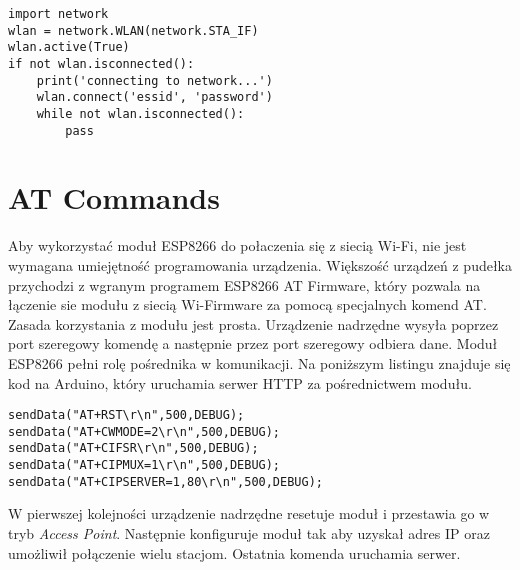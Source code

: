 \begin{lstlisting}[style=custompython, caption={Przykładowy kod do 
    połączenia się z siecią Wi-Fi w języku MicroPython},
    captionpos=b]
import network
wlan = network.WLAN(network.STA_IF)
wlan.active(True)
if not wlan.isconnected():
    print('connecting to network...')
    wlan.connect('essid', 'password')
    while not wlan.isconnected():
        pass
\end{lstlisting}


 
\section{AT Commands}
\label{AT}
Aby wykorzystać moduł ESP8266 do połaczenia się z siecią Wi-Fi, nie jest wymagana
umiejętność programowania urządzenia. Większość urządzeń z pudełka przychodzi z wgranym
programem ESP8266 AT Firmware, który pozwala na łączenie sie modułu z siecią Wi-Firmware
za pomocą specjalnych komend AT. Zasada korzystania z modułu jest prosta. Urządzenie 
nadrzędne wysyła poprzez port szeregowy komendę a następnie przez port szeregowy odbiera dane.
Moduł ESP8266 pełni rolę pośrednika w komunikacji. Na poniższym listingu znajduje się 
kod na Arduino, który uruchamia serwer HTTP za pośrednictwem modułu.\\

\begin{lstlisting}[style=customc,
    frame=single,
    caption={Kod uruchamiający serwer HTTP na płytce Arduino z wykorzystaniem modułu ESP8266},
    captionpos=b,
    label={projekt_adc_task}]
sendData("AT+RST\r\n",500,DEBUG); 
sendData("AT+CWMODE=2\r\n",500,DEBUG); 
sendData("AT+CIFSR\r\n",500,DEBUG);
sendData("AT+CIPMUX=1\r\n",500,DEBUG); 
sendData("AT+CIPSERVER=1,80\r\n",500,DEBUG); 
\end{lstlisting}

W pierwszej kolejności urządzenie nadrzędne resetuje moduł i przestawia go w tryb 
\textit{Access Point}. Następnie konfiguruje moduł tak aby uzyskał adres IP oraz 
umożliwił połączenie wielu stacjom. Ostatnia komenda uruchamia serwer.


